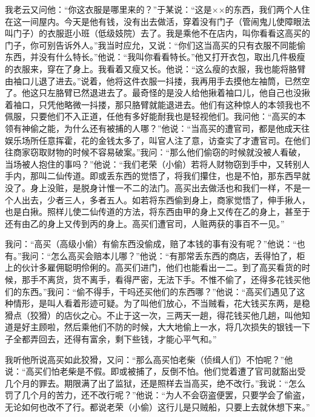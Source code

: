 \documentclass[12pt,UTF8]{ctexbook}
\begin{document}
我老云又问他：“你这衣服是哪里来的？”于某说：“这是××的东西，我们两个人住在这一间屋内。今天是他有钱，没有出去做活，穿着没有门子（管闹鬼儿使障眼法叫门子）的衣服逛小班（低级妓院）去了。我是乘他不在店内，叫你看看这高买的门子，你可别告诉外人。”我当时应允，又说：“你们这当高买的只有衣服不同能偷东西，并没有什么特长。”他说：“我叫你看看特长。”他又打开衣包，取出几件极瘦的衣服来，穿在了身上。我看着又瘦又长。他说：“这么瘦的衣服，我也能将胳臂由袖口儿退了进去。”说着，他将这件衣服一抖搂，我再用手去摸他左袖筒，已然空了。他这只左胳臂已然退进去了。最奇怪的是没人给他揪着袖口儿，他自己也没揪着袖口，只凭他略微一抖搂，那只胳臂就能退进去。他们有这种惊人的本领我也不佩服，只要他们不入正道，任他有多好能耐我也是轻视他们。我问他：“高买的本领有神偷之能，为什么还有被捕的人哪？”他说：“当高买的遭官司，都是他成天往娱乐场所任意挥霍，花的金钱太多了，叫官人注了意，访查实了才遭官司。在他们往商家窃取财物的时候不容易破案。”我问：“那么他们偷窃的时候就没被人看破，当场被人抱住的事吗？”他说：“我们老荣（小偷）若将人财物窃到手中，又转别人手内，那叫二仙传道。即或丢东西的觉悟了，将我们攥住，也是不怕，那东西早就没了。身上没赃，是脱身计惟一不二的法门。高买出去做活也和我们一样，不是一个人出去，少者三人，多者五人。如若将东西偷到身上，商家觉悟了，伸手揪人，也是白揪。照样儿使二仙传道的方法，将东西由甲的身上又传在乙的身上，甚至于还有由乙的身上又传到丙的身上。高买们遭官司，人赃两获的事百不一见。”

我问：“高买（高级小偷）有偷东西没偷成，赔了本钱的事有没有呢？”他说：“也有。”我问：“怎么高买会赔本儿哪？”他说：“有那常丢东西的商店，丢得怕了，柜上的伙计多雇佣聪明伶俐的。高买们进门，他们也能看出一二。到了高买看货的时候，那手不离货，货不离手，看得严密，无法下手。不惟不偷了，还得多花钱买他们的东西。”我问：“偷不得手，干吗还买他们的东西哪？”他说：“高买们遇见了这种情形，是叫人看着形迹可疑。为了叫他们放心，不当贼看，花大钱买东两，是稳猾点（狡猾）的店伙之心。不止于这一次，三两天一趟，得花钱买他几趟，叫他知道是好主顾啦，然后乘他们不防的时候，大大地偷上一水，将几次损失的银钱一下子全都弄回去，还得有富余，剩下些钱，才能心平气和。”

我听他所说高买如此狡猾，又问：“那么高买怕老柴（侦缉人们）不怕呢？”他说：“高买们怕老柴是不假。即或被捕了，反倒不怕。他们觉着遭了官司就豁出受几个月的罪去。期限满了出了监狱，还是照样去当高买，绝不改行。”我说：“怎么罚了几个月的苦力，还不改行呢？”他说：“为人不会窃盗便罢，只要学会了偷盗，无论如何也改不了行。都说老荣（小偷）这行儿是只贼船，只要上去就休想下来。”
\end{document}
